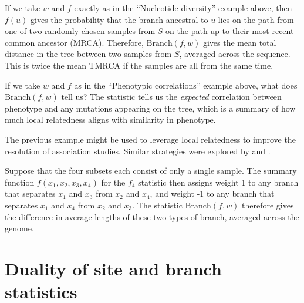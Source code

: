 \documentclass{article}
\newcommand{\branch}{\mbox{Branch}} %
\newcommand{\iw}{w} %
\begin{document}
\begin{example} \label{ex:branch_diversity}
    If we take $\iw$ and $f$ exactly as in the ``Nucleotide diversity'' example above,
    then $f(u)$ gives the probability that the branch ancestral to $u$
    lies on the path from one of two randomly chosen samples from $S$
    on the path up to their most recent common ancestor (MRCA).
    Therefore, $\branch(f, \iw)$
    gives the mean total distance in the tree between two samples from $S$,
    averaged across the sequence.
    This is twice the mean TMRCA if the samples are all from the same time.
\end{example}

\begin{example} \label{ex:branch_correlation}
    If we take $\iw$ and $f$ as in the ``Phenotypic correlations'' example above,
    what does $\branch(f, \iw)$ tell us?
    The statistic tells us the \emph{expected} correlation between phenotype and any mutations
    appearing on the tree, which is a summary of how much local relatedness
    aligns with similarity in phenotype.
\end{example}

The previous example might be used to leverage local relatedness
to improve the resolution of association studies.
Similar strategies were explored by \citet{zollner2005coalescent} and \citet{minichiello2006mapping}.

\begin{example}[Patterson's $f_4$] \label{ex:branch_f4}
    Suppose that the four subsets each consist of only a single sample.
    The summary function $f(x_1, x_2, x_3, x_4)$ for the $f_4$ statistic
    then assigns weight 1 to any branch that separates $x_1$ and $x_3$ from $x_2$ and $x_4$,
    and weight -1 to any branch that separates $x_1$ and $x_4$ from $x_2$ and $x_3$.
    The statistic $\branch(f, \iw)$ therefore
    gives the difference in average lengths of these two types of branch,
    averaged across the genome.
\end{example}



\section*{Duality of site and branch statistics}
\end{document}
